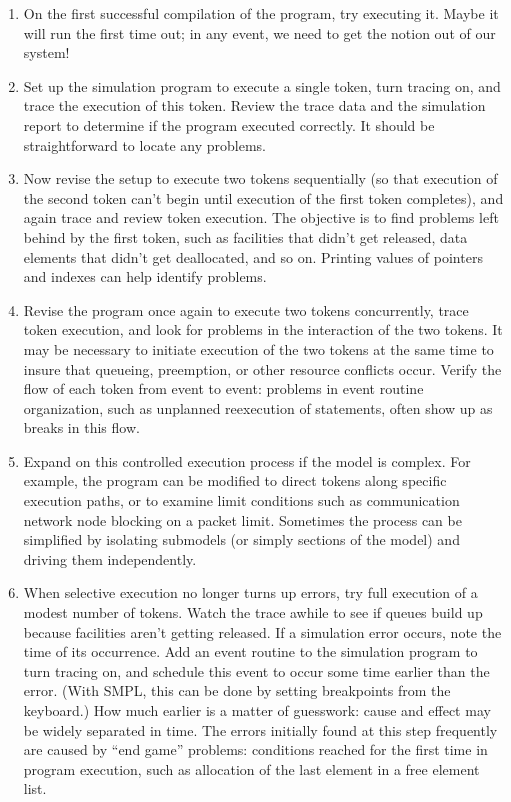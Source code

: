 \begin{enumerate}
\setlength{\itemsep}{0pt}
\setlength{\parsep}{0pt}
\item On the first successful compilation of the program, try executing it.
Maybe it will run the first time out; in any event, we need to get the notion
out of our system!

\item Set up the simulation program to execute a single token, turn tracing
on, and trace the execution of this token. Review the trace data and the
simulation report to determine if the program executed correctly. It should be
straightforward to locate any problems.

\item Now revise the setup to execute two tokens sequentially (so that
execution of the second token can't begin until execution of the first token
completes), and again trace and review token execution. The objective is to
find problems left behind by the first token, such as facilities that didn't
get released, data elements that didn't get deallocated, and so on. Printing
values of pointers and indexes can help identify problems.

\item Revise the program once again to execute two tokens concurrently, trace
token execution, and look for problems in the interaction of the two tokens.
It may be necessary to initiate execution of the two tokens at the same time
to insure that queueing, preemption, or other resource conflicts occur. Verify
the flow of each token from event to event: problems in event routine
organization, such as unplanned reexecution of statements, often show up as
breaks in this flow.

\item Expand on this controlled execution process if the model is complex. For
example, the program can be modified to direct tokens along specific execution
paths, or to examine limit conditions such as communication network node
blocking on a packet limit. Sometimes
\noindent the process can be simplified by
isolating submodels (or simply sections of the model) and driving them
independently.

\item When selective execution no longer turns up errors, try full execution
of a modest number of tokens. Watch the trace awhile to see if queues build up
because facilities aren't getting released. If a simulation error occurs, note
the time of its occurrence. Add an event routine to the simulation program to
turn tracing on, and schedule this event to occur some time earlier than the
error. (With SMPL, this can be done by setting breakpoints from the keyboard.)
How much earlier is a matter of guesswork: cause and effect may be widely
separated in time. The errors initially found at this step frequently are
caused by ``end game'' problems: conditions reached for the first time in
program execution, such as allocation of the last element in a free element
list.


\end{enumerate}
